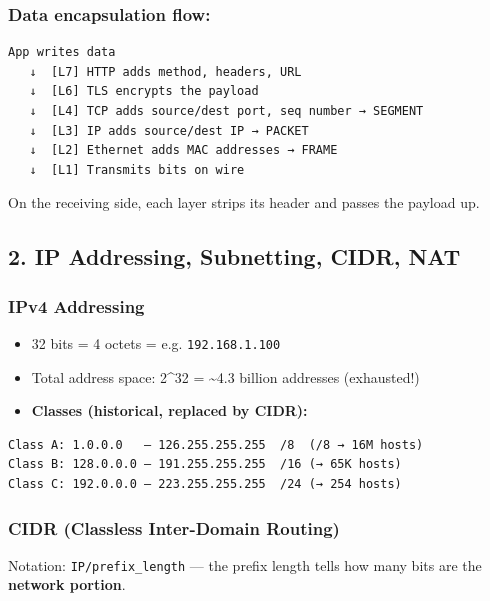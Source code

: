 \documentclass[11pt]{article}
\providecommand{\tightlist}{\setlength{\itemsep}{1pt}\setlength{\parskip}{0pt}}
\begin{document}
\subsubsection{Data encapsulation flow:}\label{data-encapsulation-flow}

\setcodelang{}

\begin{verbatim}
App writes data
   ↓  [L7] HTTP adds method, headers, URL
   ↓  [L6] TLS encrypts the payload
   ↓  [L4] TCP adds source/dest port, seq number → SEGMENT
   ↓  [L3] IP adds source/dest IP → PACKET
   ↓  [L2] Ethernet adds MAC addresses → FRAME
   ↓  [L1] Transmits bits on wire
\end{verbatim}

On the receiving side, each layer strips its header and passes the payload up.

\subsection{2. IP Addressing, Subnetting, CIDR, NAT}\label{2-ip-addressing-subnetting-cidr-nat}

\subsubsection{IPv4 Addressing}\label{ipv4-addressing}

\begin{itemize}
\tightlist
\item
  32 bits = 4 octets = e.g. \texttt{192.168.1.100}
\item
  Total address space: 2\^{}32 = \textasciitilde4.3 billion addresses (exhausted!)
\item
  \textbf{Classes (historical, replaced by CIDR):}
\end{itemize}

\setcodelang{}

\begin{verbatim}
Class A: 1.0.0.0   – 126.255.255.255  /8  (/8 → 16M hosts)
Class B: 128.0.0.0 – 191.255.255.255  /16 (→ 65K hosts)
Class C: 192.0.0.0 – 223.255.255.255  /24 (→ 254 hosts)
\end{verbatim}

\subsubsection{CIDR (Classless Inter-Domain Routing)}\label{cidr-classless-inter-domain-routing}

Notation: \texttt{IP/prefix\_length} --- the prefix length tells how many bits are the \textbf{network portion}.
\end{document}
